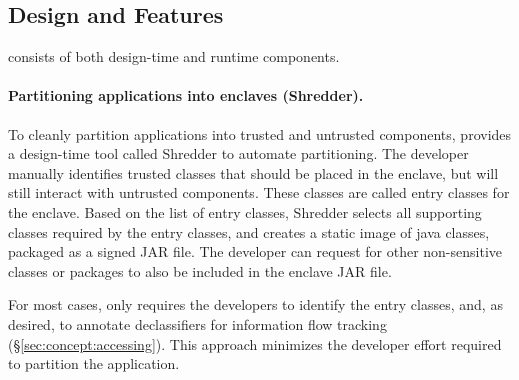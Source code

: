 \subsection{Design and Features}

\sysname{} consists of both design-time and runtime components.  

\paragraph{Partitioning \java{} applications into enclaves (Shredder).}
To cleanly partition \java{} applications into
 trusted and untrusted components,
\sysname{} provides a design-time tool called Shredder
to automate partitioning.
The developer manually identifies trusted classes that should be placed in the enclave,
but will still interact with untrusted components.
These classes are called entry classes for the enclave.
Based on the list of entry classes, 
Shredder selects all supporting classes required by the entry classes,
and creates a static image of java classes, packaged as a signed JAR file.
The developer can request for other non-sensitive classes or packages to also be included in the enclave JAR file.


For most cases, \sysname{} only requires the developers
to identify the entry classes, and, as desired, to annotate declassifiers for information flow tracking (\S\ref{sec:concept:accessing}).
This approach minimizes the developer effort required to partition the application.


